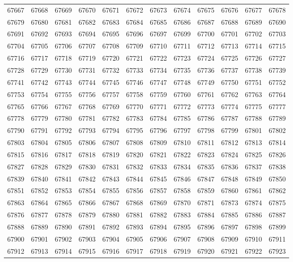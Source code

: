 \begin{center}
\begin{longtable}{llllllllllll}
67667 &67668 &67669 &67670 &67671 &67672 &67673 &67674 &67675 &67676 &67677 &67678 \\
67679 &67680 &67681 &67682 &67683 &67684 &67685 &67686 &67687 &67688 &67689 &67690 \\
67691 &67692 &67693 &67694 &67695 &67696 &67697 &67699 &67700 &67701 &67702 &67703 \\
67704 &67705 &67706 &67707 &67708 &67709 &67710 &67711 &67712 &67713 &67714 &67715 \\
67716 &67717 &67718 &67719 &67720 &67721 &67722 &67723 &67724 &67725 &67726 &67727 \\
67728 &67729 &67730 &67731 &67732 &67733 &67734 &67735 &67736 &67737 &67738 &67739 \\
67741 &67742 &67743 &67744 &67745 &67746 &67747 &67748 &67749 &67750 &67751 &67752 \\
67753 &67754 &67755 &67756 &67757 &67758 &67759 &67760 &67761 &67762 &67763 &67764 \\
67765 &67766 &67767 &67768 &67769 &67770 &67771 &67772 &67773 &67774 &67775 &67777 \\
67778 &67779 &67780 &67781 &67782 &67783 &67784 &67785 &67786 &67787 &67788 &67789 \\
67790 &67791 &67792 &67793 &67794 &67795 &67796 &67797 &67798 &67799 &67801 &67802 \\
67803 &67804 &67805 &67806 &67807 &67808 &67809 &67810 &67811 &67812 &67813 &67814 \\
67815 &67816 &67817 &67818 &67819 &67820 &67821 &67822 &67823 &67824 &67825 &67826 \\
67827 &67828 &67829 &67830 &67831 &67832 &67833 &67834 &67835 &67836 &67837 &67838 \\
67839 &67840 &67841 &67842 &67843 &67844 &67845 &67846 &67847 &67848 &67849 &67850 \\
67851 &67852 &67853 &67854 &67855 &67856 &67857 &67858 &67859 &67860 &67861 &67862 \\
67863 &67864 &67865 &67866 &67867 &67868 &67869 &67870 &67871 &67873 &67874 &67875 \\
67876 &67877 &67878 &67879 &67880 &67881 &67882 &67883 &67884 &67885 &67886 &67887 \\
67888 &67889 &67890 &67891 &67892 &67893 &67894 &67895 &67896 &67897 &67898 &67899 \\
67900 &67901 &67902 &67903 &67904 &67905 &67906 &67907 &67908 &67909 &67910 &67911 \\
67912 &67913 &67914 &67915 &67916 &67917 &67918 &67919 &67920 &67921 &67922 &67923 \\

\end{longtable}
\end{center}
